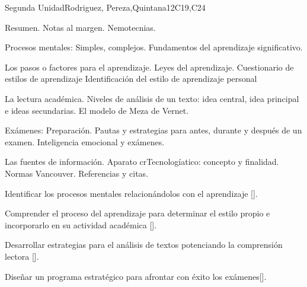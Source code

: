 \begin{syllabus}
\begin{unit}{}{Segunda Unidad}{Rodriguez, Pereza,Quintana}{12}{C19,C24}
\begin{topics}
   \item Resumen. Notas al margen. Nemotecnias.
   \item Procesos mentales: Simples, complejos. Fundamentos del aprendizaje significativo.
   \item Los pasos o factores para el aprendizaje. Leyes del aprendizaje. Cuestionario de estilos de aprendizaje Identificación del estilo de aprendizaje personal
   \item La lectura académica. Niveles de  análisis de un texto: idea central, idea principal e ideas secundarias. El modelo de Meza de Vernet.
   \item Exámenes: Preparación. Pautas y estrategias para antes, durante y después de un examen. Inteligencia emocional y exámenes.
   \item Las fuentes de información. Aparato crTecnologíatico: concepto y finalidad. Normas Vancouver. Referencias y citas.
\end{topics}
\begin{learningoutcomes}
        \item Identificar los procesos mentales relacionándolos con el aprendizaje [\Usage].
        \item Comprender el proceso del aprendizaje para determinar el estilo propio e incorporarlo en su actividad académica [\Usage].
        \item Desarrollar estrategias para el análisis de textos potenciando la comprensión lectora [\Usage].
        \item Diseñar un programa estratégico para afrontar con éxito los exámenes[\Usage].
\end{learningoutcomes}
\end{unit}


\end{syllabus}

